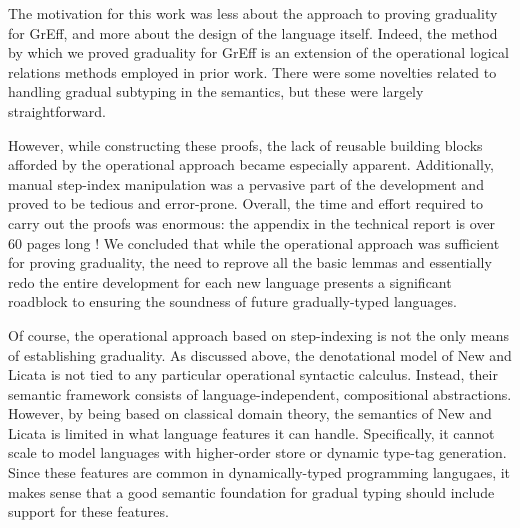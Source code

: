 \documentclass{article}
\theoremstyle{definition}
\theoremstyle{remark}
\begin{document}
The motivation for this work was less about the approach to proving graduality
for GrEff, and more about the design of the language itself. Indeed, the method
by which we proved graduality for GrEff is an extension of the operational
logical relations methods employed in prior work. There were some novelties
related to handling gradual subtyping in the semantics, but these were largely
straightforward.

However, while constructing these proofs, the lack of reusable building blocks
afforded by the operational approach became especially apparent. Additionally,
manual step-index manipulation was a pervasive part of the development and
proved to be tedious and error-prone. Overall, the time and effort required to
carry out the proofs was enormous: the appendix in the technical report is over
60 pages long \cite{new-giovannini-licata-2022-extended}!
%
We concluded that while the operational approach was sufficient for proving
graduality, the need to reprove all the basic lemmas and essentially redo the
entire development for each new language presents a significant roadblock to
ensuring the soundness of future gradually-typed languages.


Of course, the operational approach based on step-indexing is not the only means
of establishing graduality. As discussed above, the denotational model of New
and Licata \cite{new-licata18} is not tied to any particular operational
syntactic calculus. Instead, their semantic framework consists of
language-independent, compositional abstractions.
%
%
However, by being based on classical domain theory, the semantics of New and
Licata is limited in what language features it can handle. Specifically, it
cannot scale to model languages with higher-order store or dynamic type-tag
generation. Since these features are common in dynamically-typed programming
langugaes, it makes sense that a good semantic foundation for gradual typing
should include support for these features.

\end{document}
